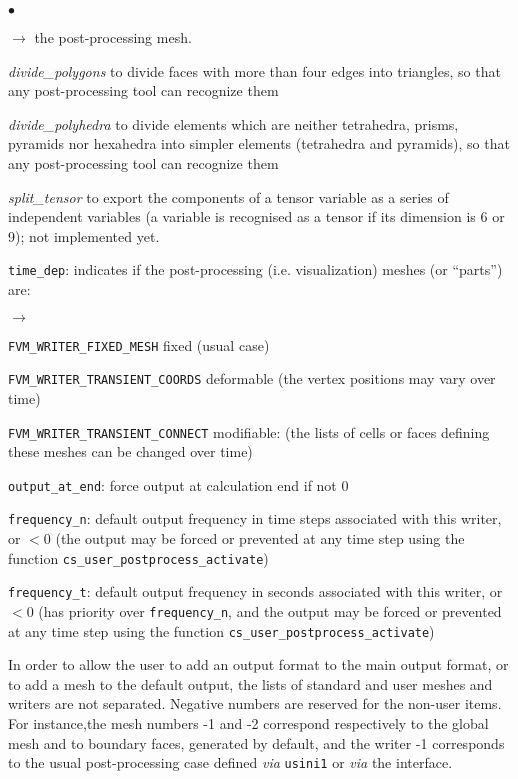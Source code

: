 {{{\begin{list}{$\bullet$}{}
\begin{list}{$\rightarrow$}{}
 the post-processing mesh.
               \item {\em divide\_polygons}  to divide faces with more than four edges
 into triangles, so that any post-processing tool can recognize them
               \item {\em divide\_polyhedra} to divide elements which are neither
 tetrahedra, prisms, pyramids nor hexahedra into simpler elements (tetrahedra and
 pyramids), so that any post-processing tool can recognize them
               \item {\em split\_tensor} to export the components of a tensor
 variable as a series of independent variables (a variable is recognised as a
 tensor if its dimension is 6 or 9); not implemented yet.
         \end{list}
       \item \texttt{time\_dep}: indicates if the post-processing
             (i.e. visualization) meshes (or ``parts'') are:
        \begin{list}{$\rightarrow$}{}
               \item \texttt{FVM\_WRITER\_FIXED\_MESH} fixed (usual case)
               \item \texttt{FVM\_WRITER\_TRANSIENT\_COORDS} deformable
                     (the vertex positions may vary over time)
               \item \texttt{FVM\_WRITER\_TRANSIENT\_CONNECT} modifiable:
                     (the lists of cells or faces
                     defining these meshes can be changed over time)
         \end{list}
       \item \texttt{output\_at\_end}: force output at calculation end
             if not 0
       \item \texttt{frequency\_n}: default output frequency in time steps
             associated with this writer, or $< 0$ (the output may be forced
             or prevented at any time step using the function
             \texttt{cs\_user\_postprocess\_activate})
       \item \texttt{frequency\_t}: default output frequency in seconds
             associated with this writer, or $< 0$ (has priority over
             \texttt{frequency\_n}, and the output may be forced or prevented
             at any time step using the function
             \texttt{cs\_user\_postprocess\_activate})
\end{list}

In order to allow the user to add an output format to
the main output format, or to add a mesh to the default
output, the lists of standard and user meshes and writers are not
separated. Negative numbers are reserved for the non-user items. For
instance,the mesh numbers -1 and -2 correspond respectively to the global
mesh and to boundary faces, generated by default, and the writer -1
corresponds to the usual post-processing case defined {\em via}
\texttt{usini1} or {\em via} the interface.

}}}
